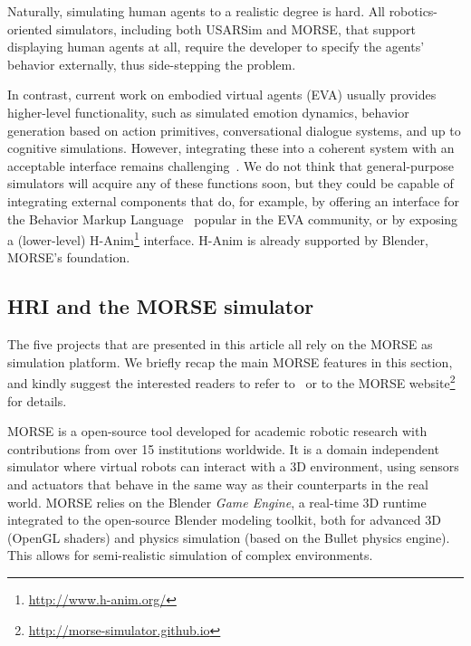 \documentclass[conference]{IEEEtran}
\begin{document}
Naturally, simulating human agents to a realistic degree is hard.
All robotics-oriented simulators, including both USARSim and MORSE, that
support displaying human agents at all, require the developer to specify the
agents' behavior externally, thus side-stepping the problem.

In contrast, current work on embodied virtual agents (EVA) usually provides 
higher-level functionality, such as simulated emotion dynamics, behavior 
generation based on action primitives, conversational dialogue systems, and
up to cognitive simulations. However, integrating these into a coherent 
system with an acceptable interface remains 
challenging~\cite{gratch2002creating}. We do not think that general-purpose
simulators will acquire any of these functions soon, but they could be
capable of integrating external components that do, for example, by offering 
an interface for the Behavior Markup Language~\cite{kopp2006towards} popular
in the EVA community, or by exposing a (lower-level) 
H-Anim\footnote{\url{http://www.h-anim.org/}} interface. H-Anim is already
supported by Blender, MORSE's foundation.




\subsection*{HRI and the MORSE simulator}

The five projects that are presented in this article all rely on the MORSE as
simulation platform. We briefly recap the main MORSE features in this section,
and kindly suggest the interested readers to refer to~\cite{morse_simpar_2012}
or to the MORSE website\footnote{\url{http://morse-simulator.github.io}} for
details.

MORSE is a open-source tool developed for academic robotic research with
contributions from over 15 institutions worldwide. It is a domain independent
simulator where virtual robots can interact with a 3D environment, using sensors
and actuators that behave in the same way as their counterparts in the real
world. MORSE relies on the Blender \emph{Game Engine}, a real-time 3D runtime
integrated to the open-source Blender modeling toolkit, both for advanced 3D
(OpenGL shaders) and physics simulation (based on the {\sc Bullet} physics
engine). This allows for semi-realistic simulation of complex environments.
\end{document}
